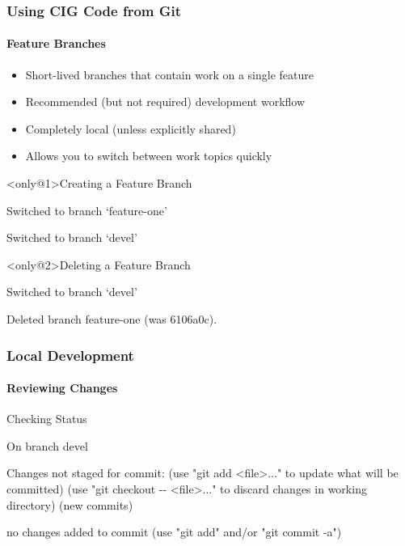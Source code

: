 \begin{frame}[fragile]
 \frametitle{Using CIG Code from Git}
 \framesubtitle{Feature Branches}

 \begin{itemize}
  \item Short-lived branches that contain work on a single feature
  \item Recommended (but not required) development workflow
  \item Completely local (unless explicitly shared)
  \item Allows you to switch between work topics quickly
 \end{itemize}

 \begin{exampleblock}<only@1>{Creating a Feature Branch}
  \vspace{-1em}
  \begin{semiverbatim}
Switched to branch `feature-one'

Switched to branch `devel'
\end{semiverbatim}
 \end{exampleblock}

 \begin{exampleblock}<only@2>{Deleting a Feature Branch}
  \vspace{-1em}
  \begin{semiverbatim}
Switched to branch `devel'

Deleted branch feature-one (was 6106a0c).
\end{semiverbatim}
 \end{exampleblock}
\end{frame}

\begin{frame}[fragile]
 \frametitle{Local Development}
 \framesubtitle{Reviewing Changes}

 \begin{exampleblock}{Checking Status}
  \vspace{-1em}
  \begin{semiverbatim}
On branch devel

Changes not staged for commit:
  (use "git add <file>..." to update what will be
   committed)
  (use "git checkout -{}- <file>..." to discard changes
   in working directory)
     (new commits)

no changes added to commit (use "git add" and/or "git
commit -a")
\end{semiverbatim}
 \end{exampleblock}
\end{frame}

